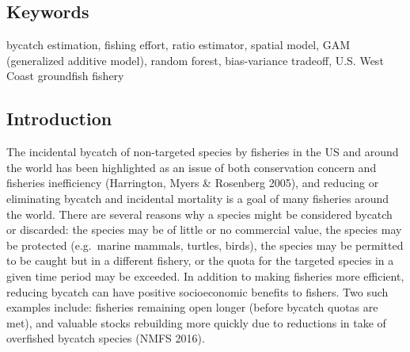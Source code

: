 \documentclass[]{article}
\begin{document}
\hypertarget{keywords}{%
\subsection{Keywords}\label{keywords}}

bycatch estimation, fishing effort, ratio estimator, spatial model, GAM
(generalized additive model), random forest, bias-variance tradeoff,
U.S. West Coast groundfish fishery

\hypertarget{introduction}{%
\subsection{Introduction}\label{introduction}}

The incidental bycatch of non-targeted species by fisheries in the US
and around the world has been highlighted as an issue of both
conservation concern and fisheries inefficiency (Harrington, Myers \&
Rosenberg 2005), and reducing or eliminating bycatch and incidental
mortality is a goal of many fisheries around the world. There are
several reasons why a species might be considered bycatch or discarded:
the species may be of little or no commercial value, the species may be
protected (e.g.~marine mammals, turtles, birds), the species may be
permitted to be caught but in a different fishery, or the quota for the
targeted species in a given time period may be exceeded. In addition to
making fisheries more efficient, reducing bycatch can have positive
socioeconomic benefits to fishers. Two such examples include: fisheries
remaining open longer (before bycatch quotas are met), and valuable
stocks rebuilding more quickly due to reductions in take of overfished
bycatch species (NMFS 2016).
\end{document}
